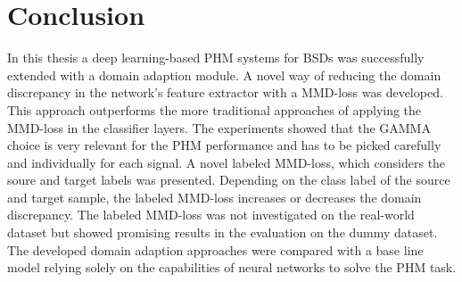 \chapter{Conclusion}\label{chapter:conclusion}
In this thesis a deep learning-based PHM systems for BSDs was successfully extended with a domain adaption module. A novel way of reducing the domain discrepancy in the network's feature extractor with a MMD-loss was developed. This approach outperforms the more traditional approaches of applying the MMD-loss in the classifier layers. The experiments showed that the GAMMA choice is very relevant for the PHM performance and has to be picked carefully and individually for each signal. A novel labeled MMD-loss, which considers the soure and target labels was presented. Depending on the class label of the source and target sample, the labeled MMD-loss increases or decreases the domain discrepancy. The labeled MMD-loss was not investigated on the real-world dataset but showed promising results in the evaluation on the dummy dataset. The developed domain adaption approaches were compared with a base line model relying solely on the capabilities of neural networks to solve the PHM task.
